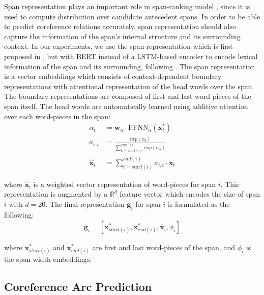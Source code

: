 \documentclass[11pt]{article}
\begin{document}
Span representation plays an important role in span-ranking model \parencite{lee2017end,lee2018higher}, since it is used to compute distribution over candidate antecedent spans. In order to be able to predict coreference relations accurately, span representation should also capture the information of the span's internal structure and its surrounding context. In our experiments, we use the span representation which is first proposed in \parencite{lee2017end}, but with BERT \parencite{devlin2019bert} instead of a LSTM-based encoder to encode lexical information of the span and its surrounding, following \parencite{joshi2019coref}. The span representation is a vector embeddings which consists of context-dependent boundary representations with attentional representation of the head words over the span. The boundary representations are composed of first and last word-pieces of the span itself. The head words are automatically learned using additive attention \parencite{bahdanau} over each word-pieces in the span:
\begin{align}
\alpha_{t} &= \pmb{w}_{\alpha} \cdot \text{FFNN}_{\alpha}(\pmb{x}_{t}^{*}) \\ 
a_{i,t} &=  \frac{exp(\alpha_{t})}{\sum\limits_{k=start(i)}^{end(i)} exp(\alpha_{k})} \\ 
\hat{\pmb{x}}_{i} &= \sum\limits_{t=start(i)}^{end(i)} a_{i,t} \cdot \pmb{x}_{t}
\end{align}

where $\hat{\pmb{x}}_{i}$ is a weighted vector representation of word-pieces for span $i$. This representation is augmented by a $\mathbb{R}^{d}$ feature vector which encodes the size of span $i$ with $d = 20$. The final representation $\pmb{g}_{i}$ for span $i$ is formulated as the following:
\begin{align}
\pmb{g}_{i} = [\pmb{x}_{start(i)}^{*}, \pmb{x}_{end(i)}^{*}, \hat{\pmb{x}}_{i}, \phi_{i}]
\end{align}  

where $\pmb{x}_{start(i)}^{*}$ and $\pmb{x}_{end(i)}^{*}$ are first and last word-pieces of the span, and $\phi_{i}$ is the span width embeddings.

\subsection{Coreference Arc Prediction}
\label{subsection:corefarc}
\end{document}
